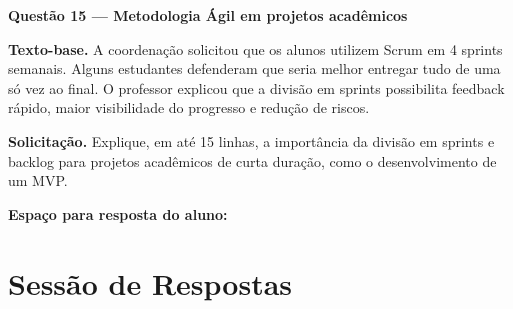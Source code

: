 \documentclass[12pt,a4paper]{article}
\begin{document}
\newpage
\noindent\textbf{Questão 15 — Metodologia Ágil em projetos acadêmicos}  
\par\noindent\textbf{Texto-base.}  
A coordenação solicitou que os alunos utilizem Scrum em 4 sprints semanais. Alguns estudantes defenderam que seria melhor entregar tudo de uma só vez ao final. O professor explicou que a divisão em sprints possibilita feedback rápido, maior visibilidade do progresso e redução de riscos.  

\noindent\textbf{Solicitação.}  
Explique, em até 15 linhas, a importância da divisão em sprints e backlog para projetos acadêmicos de curta duração, como o desenvolvimento de um MVP.

\vspace{0.5cm}
\noindent\textbf{Espaço para resposta do aluno:}





\clearpage


\clearpage
\section*{Sessão de Respostas}
\end{document}
